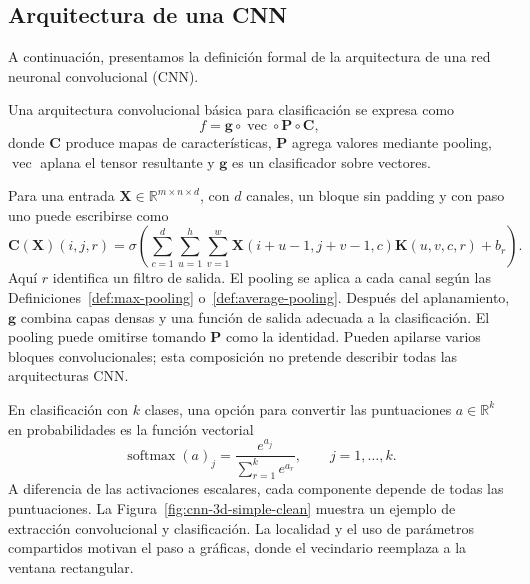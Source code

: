 \subsection{Arquitectura de una CNN}
A continuación, presentamos la definición formal de la arquitectura de una red neuronal convolucional (CNN).

\begin{definition}
\label{def:arquitectura-cnn}
Una arquitectura convolucional básica para clasificación se expresa como
\[
f=\mathbf g\circ\operatorname{vec}\circ\mathbf P\circ\mathbf C,
\]
donde $\mathbf C$ produce mapas de características, $\mathbf P$ agrega valores mediante pooling, $\operatorname{vec}$ aplana el tensor resultante y $\mathbf g$ es un clasificador sobre vectores.

Para una entrada $\mathbf X\in\mathbb R^{m\times n\times d}$, con $d$ canales, un bloque sin padding y con paso uno puede escribirse como
\[
\mathbf C(\mathbf X)(i,j,r)
=\sigma\!\left(\sum_{c=1}^{d}\sum_{u=1}^{h}\sum_{v=1}^{w}
\mathbf X(i+u-1,j+v-1,c)\mathbf K(u,v,c,r)+b_r\right).
\]
Aquí $r$ identifica un filtro de salida. El pooling se aplica a cada canal según las Definiciones~\ref{def:max-pooling} o~\ref{def:average-pooling}. Después del aplanamiento, $\mathbf g$ combina capas densas y una función de salida adecuada a la clasificación. El pooling puede omitirse tomando $\mathbf P$ como la identidad. Pueden apilarse varios bloques convolucionales; esta composición no pretende describir todas las arquitecturas CNN.
\end{definition}

En clasificación con $k$ clases, una opción para convertir las puntuaciones $a\in\mathbb R^k$ en probabilidades es la función vectorial
\[
\operatorname{softmax}(a)_j=\frac{e^{a_j}}{\sum_{r=1}^{k}e^{a_r}},\qquad j=1,\ldots,k.
\]
A diferencia de las activaciones escalares, cada componente depende de todas las puntuaciones. La Figura~\ref{fig:cnn-3d-simple-clean} muestra un ejemplo de extracción convolucional y clasificación. La localidad y el uso de parámetros compartidos motivan el paso a gráficas, donde el vecindario reemplaza a la ventana rectangular.

